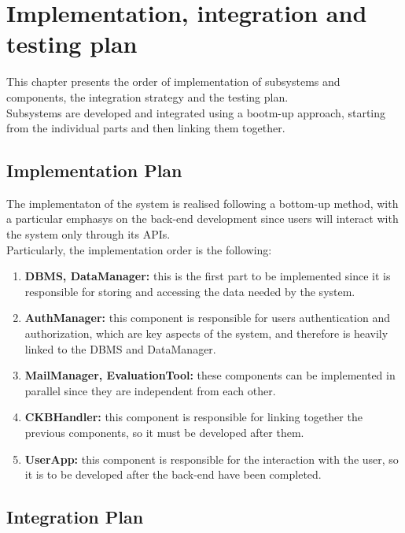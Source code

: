 \chapter{Implementation, integration and testing plan}
This chapter presents the order of implementation of subsystems and components, 
the integration strategy and the testing plan.\\
Subsystems are developed and integrated using a bootm-up approach, starting from the 
individual parts and then linking them together.\\

\section{Implementation Plan}
The implementaton of the system is realised following a bottom-up method, with a particular 
emphasys on the back-end development since users will interact with the system only through 
its APIs.\\
Particularly, the implementation order is the following:
\begin{enumerate}
    \item \textbf{DBMS, DataManager:} this is the first part to be implemented since it is responsible 
    for storing and accessing the data needed by the system.
    \item \textbf{AuthManager:} this component is responsible for users authentication and authorization, 
    which are key aspects of the system, and therefore is heavily linked to the DBMS and DataManager.
    \item \textbf{MailManager, EvaluationTool:} these components can be implemented in parallel since they are 
    independent from each other.
    \item \textbf{CKBHandler:} this component is responsible for linking together the previous components, so 
    it must be developed after them.
    \item \textbf{UserApp:} this component is responsible for the interaction with the user, so it is to be 
    developed after the back-end have been completed.
\end{enumerate}
\section{Integration Plan}

